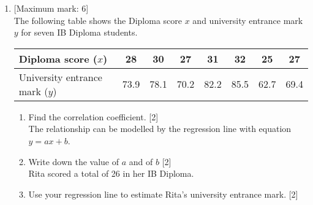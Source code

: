 \documentclass[12pt, twoside]{article}
\begin{document}
\begin{enumerate}
\newpage 
    \item {[Maximum mark: 6]} \\[0.3cm]
    The following table shows the Diploma score $x$ and university entrance mark $y$ for seven IB Diploma students. 
            \begin{center}
            \begin{tabular}{|l|c|c|c|c|c|c|c|}
                \hline
                Diploma score ($x$) & 28 & 30 & 27 & 31 & 32 & 25 & 27 \\ 
                \hline 
                University entrance mark ($y$) & 73.9 & 78.1 & 70.2 & 82.2 & 85.5 & 62.7 & 69.4 \\ 
                \hline 
                \end{tabular}
            \end{center}
            \begin{enumerate}
                \item Find the correlation coefficient. \hfill [2]\\[0.25cm]
                The relationship can be modelled by the regression line with equation $y=ax+b$.
                \item Write down the value of $a$ and of $b$ \hfill [2]\\[0.25cm]
                Rita scored a total of 26 in her IB Diploma.
                \item Use your regression line to estimate Rita's university entrance mark. \hfill [2]
            \end{enumerate}

                    
\end{enumerate}
\end{document}

